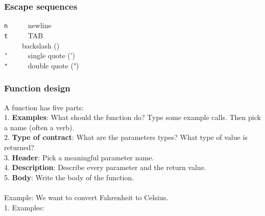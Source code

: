 \documentclass{article}
\begin{document}
{{{\subsubsection{Escape sequences}

\setminus\texttt{n} ~ ~ ~  newline\\
\setminus \texttt{t} ~ ~ ~ TAB\\
\setminus \setminus ~ ~ ~  backslash (\setminus)\\
\setminus \texttt{'} ~ ~ ~ single quote (')\\
\setminus \texttt{"} ~ ~ ~ double quote (")\\

\subsubsection{Function design}
A function has five parts:\\
1. \textbf{Examples}: What should the function do? Type some example calls. Then pick a name (often a verb).\\
2. \textbf{Type of contract}: What are the parameters types? What type of value is returned?\\
3. \textbf{Header}: Pick a meaningful parameter name.\\
4. \textbf{Description}: Describe every parameter and the return value.\\
5. \textbf{Body}: Write the body of the function.\\ 
\\
Example: We want to convert Fahrenheit to Celsius.\\
1. Examples:\\

}}}
\end{document}
